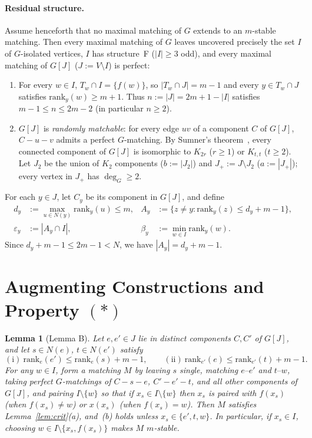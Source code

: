 \documentclass[11pt]{article}
\newtheorem{lemma}[theorem]{Lemma}
\begin{document}
\paragraph{Residual structure.} Assume henceforth that no maximal matching of $G$ extends to an $m$-stable matching. Then every maximal matching of $G$ leaves uncovered precisely the set $I$ of $G$-isolated vertices, $I$ has structure~F ($|I| \ge 3$ odd), and every maximal matching of $G[J]$ ($J := V \setminus I$) is perfect:
\begin{enumerate}
  \item[(R1)] For every $w \in I$, $T_w \cap I = \{f(w)\}$, so $|T_w \cap J| = m-1$ and every $y \in T_w \cap J$ satisfies $\mathrm{rank}_y(w) \ge m+1$. Thus $n := |J| = 2m+1 - |I|$ satisfies $m-1 \le n \le 2m-2$ (in particular $n \ge 2$).
  \item[(R2)] $G[J]$ is \emph{randomly matchable}: for every edge $uv$ of a component $C$ of $G[J]$, $C - u - v$ admits a perfect $G$-matching. By Sumner's theorem~\cite{Sum79}, every connected component of $G[J]$ is isomorphic to $K_{2r}$ ($r \ge 1$) or $K_{t,t}$ ($t \ge 2$). Let $J_2$ be the union of $K_2$ components ($b := |J_2|$) and $J_+ := J \setminus J_2$ ($a := |J_+|$); every vertex in $J_+$ has $\deg_G \ge 2$.
\end{enumerate}

For each $y \in J$, let $C_y$ be its component in $G[J]$, and define
\begin{align*}
d_y &:= \max_{u \in N(y)} \mathrm{rank}_y(u) \le m, &
A_y &:= \{z \neq y : \mathrm{rank}_y(z) \le d_y + m - 1\}, \\
\varepsilon_y &:= |A_y \cap I|, &
\beta_y &:= \min_{w \in I} \mathrm{rank}_y(w).
\end{align*}
Since $d_y + m - 1 \le 2m - 1 < N$, we have $|A_y| = d_y + m - 1$.

\section{Augmenting Constructions and Property $(\ast)$}

\begin{lemma}[Lemma B]\label{lem:B}
Let $e, e' \in J$ lie in distinct components $C, C'$ of $G[J]$, and let $s \in N(e)$, $t \in N(e')$ satisfy
\[
\mathrm{(i)}\ \mathrm{rank}_e(e') \le \mathrm{rank}_e(s) + m - 1, \qquad
\mathrm{(ii)}\ \mathrm{rank}_{e'}(e) \le \mathrm{rank}_{e'}(t) + m - 1.
\]
For any $w \in I$, form a matching $M$ by leaving $s$ single, matching $e\text{--}e'$ and $t\text{--}w$, taking perfect $G$-matchings of $C-s-e$, $C'-e'-t$, and all other components of $G[J]$, and pairing $I \setminus \{w\}$ so that if $x_s \in I \setminus \{w\}$ then $x_s$ is paired with $f(x_s)$ (when $f(x_s) \neq w$) or $x(x_s)$ (when $f(x_s) = w$). Then $M$ satisfies Lemma~\ref{lem:crit}(a), and~(b) holds unless $x_s \in \{e', t, w\}$. In particular, if $x_s \in I$, choosing $w \in I \setminus \{x_s, f(x_s)\}$ makes $M$ $m$-stable.
\end{lemma}
\end{document}
